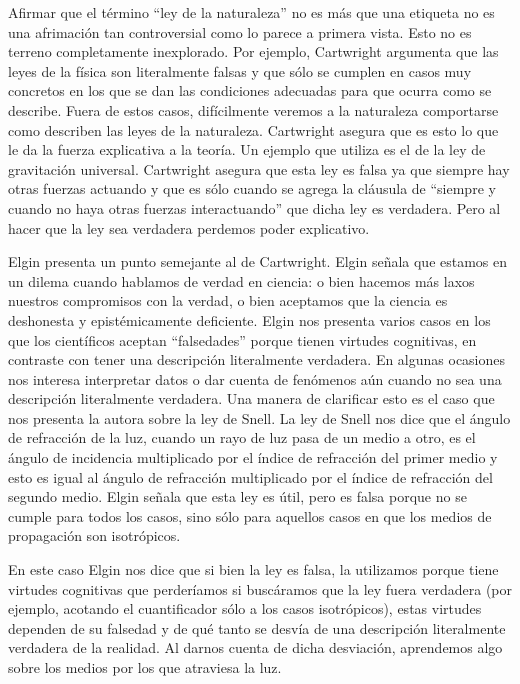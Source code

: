 \noindent Afirmar que el término ``ley de la naturaleza'' no es más que una etiqueta no es una afrimación tan controversial como lo parece a primera vista. Esto no es terreno completamente inexplorado. Por ejemplo, Cartwright \citeyear{Cartwright1983} argumenta que las leyes de la física son literalmente falsas y que sólo se cumplen en casos muy concretos en los que se dan las condiciones adecuadas para que ocurra como se describe. Fuera de estos casos, difícilmente veremos a la naturaleza comportarse como describen las leyes de la naturaleza. Cartwright asegura que es esto lo que le da la fuerza explicativa a la teoría. Un ejemplo que utiliza es el de la ley de gravitación universal. Cartwright asegura que esta ley es falsa ya que siempre hay otras fuerzas actuando y que es sólo cuando se agrega la cláusula de ``siempre y cuando no haya otras fuerzas interactuando'' que dicha ley es verdadera. Pero al hacer que la ley sea verdadera perdemos poder explicativo.

Elgin presenta un punto semejante al de Cartwright. Elgin \citeyear{Elgin2004} señala que estamos en un dilema cuando hablamos de verdad en ciencia: o bien hacemos más laxos nuestros compromisos con la verdad, o bien aceptamos que la ciencia es deshonesta y epistémicamente deficiente. Elgin nos presenta varios casos en los que los científicos aceptan ``falsedades'' porque tienen virtudes cognitivas, en contraste con tener una descripción literalmente verdadera. En algunas ocasiones nos interesa interpretar datos o dar cuenta de fenómenos aún cuando no sea una descripción literalmente verdadera. Una manera de clarificar esto es el caso que nos presenta la autora sobre la ley de Snell. La ley de Snell nos dice que el ángulo de refracción de la luz, cuando un rayo de luz pasa de un medio a otro, es el ángulo de incidencia multiplicado por el índice de refracción del primer medio y esto es igual al ángulo de refracción multiplicado por el índice de refracción del segundo medio. Elgin señala que esta ley es útil, pero es falsa porque no se cumple para todos los casos, sino sólo para aquellos casos en que los medios de propagación son isotrópicos.

En este caso Elgin nos dice que si bien la ley es falsa, la utilizamos porque tiene virtudes cognitivas que perderíamos si buscáramos que la ley fuera verdadera (por ejemplo, acotando el cuantificador sólo a los casos isotrópicos), estas virtudes dependen de su falsedad y de qué tanto se desvía de una descripción literalmente verdadera de la realidad. Al darnos cuenta de dicha desviación, aprendemos algo sobre los medios por los que atraviesa la luz.

